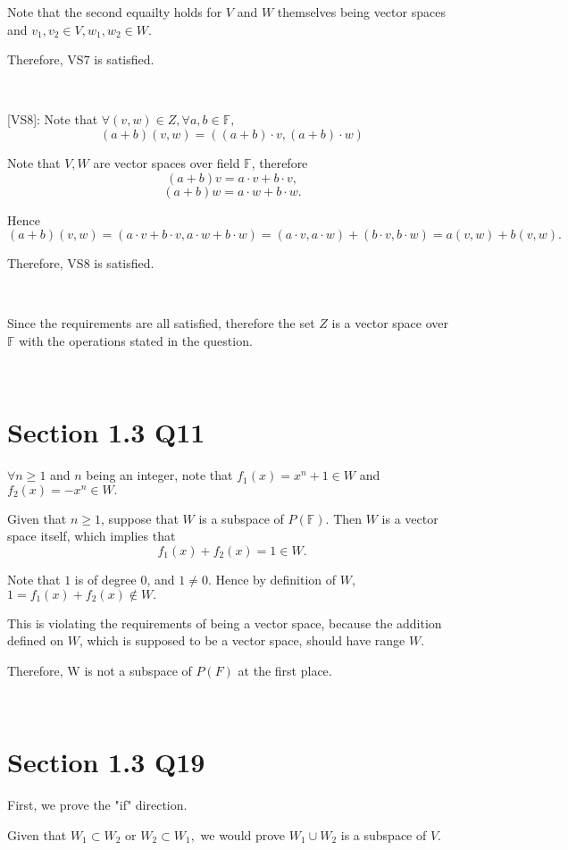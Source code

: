 \documentclass[12pt]{article}%
\begin{document}
Note that the second equailty holds for $V$ and $W$ themselves being vector spaces and $v_1,v_2 \in V, w_1, w_2\in W.$

Therefore, VS7 is satisfied. 

~\ 

[VS8]: Note that $\forall (v,w)\in Z, \forall a,b \in \mathbb{F},$ $$(a+b)(v,w)=((a+b)\cdot v,(a+b)\cdot w )$$ 

Note that $V,W$ are vector spaces over field $\mathbb{F}$, therefore $$(a+b)v=a\cdot v + b\cdot v,$$ $$(a+b)w=a\cdot w + b\cdot w.$$

Hence $$(a+b)(v,w)=(a\cdot v + b\cdot v,a\cdot w + b\cdot w)=(a\cdot v, a\cdot w)+ (b\cdot v, b\cdot w)=a(v,w)+b(v,w).$$

Therefore, VS8 is satisfied. 

~\ 

Since the requirements are all satisfied, therefore the set $Z$ is a vector space over $\mathbb{F}$ with the operations stated in the question.

~\ 

\section{Section 1.3 Q11}

$\forall n\geq 1$ and $n$ being an integer, note that $f_1(x) = x^{n}+1 \in W$ and $f_2(x)=-x^{n} \in W.$

Given that $n\geq 1$, suppose that $W$ is a subspace of $P(\mathbb{F}).$ Then $W$ is a vector space itself, which implies that $$f_1(x)+f_2(x)=1\in W.$$

Note that $1$ is of degree 0, and $1\neq 0.$ Hence by definition of $W$, $1=f_1(x)+f_2(x)\notin W.$

This is violating the requirements of being a vector space, because the addition defined on $W$, which is supposed to be a vector space, should have range $W$.

Therefore, W is not a subspace of $P(F)$ at the first place. 

~\ 

\section{Section 1.3 Q19}

First, we prove the "if" direction. 

Given that $W_1\subset W_2$ or $W_2 \subset W_1,$ we would prove $W_1 \cup W_2$ is a subspace of $V$.
\end{document}
